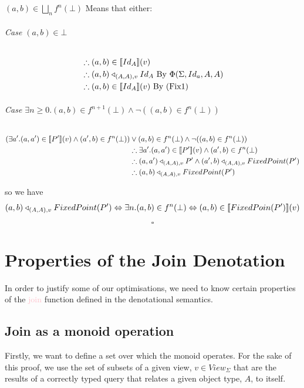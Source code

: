 \documentclass[12pt,a4paper,twoside,openright]{report}
\newcommand\mathName[1]{\textcolor{pink}{#1}}
\newcommand{\db}[1]{{\bf [\![}#1{\bf ]\!]}}
\newcommand{\deno}[1]{\db{#1}(v)}
\newcommand{\denoRule}[2]{#1 \in \deno{#2}}
\newcommand{\opRule}[3]{#1 \triangleleft_{#2, v} #3}
\newcommand{\phiRule}[3]{\Phi(\Sigma, #1, #2, #3)}
\begin{document}
$(a, b) \in \bigsqcup_n f^n(\bot)$ Means that either:

\subparagraph{Case $(a, b) \in \bot$}
\begin{equation}
\label{Case Bottom}
\begin{split}
& \therefore \denoRule{(a,b)}{Id_A}\\
& \therefore \opRule{(a,b)}{(A, A)}{Id_A} \mbox{ By $\phiRule{Id_a}{A}{A}$}\\
& \therefore \denoRule{(a,b)}{Id_A} \mbox{ By (Fix1)}
\end{split}
\end{equation}

\subparagraph{Case $\exists n \geq 0. (a, b) \in f^{n+1}(\bot) \wedge \neg ((a, b) \in f^n(\bot))$}
\begin{equation}
\label{Case n+1}
\begin{split}
(\exists a'. \denoRule{(a, a')}{P'} \wedge (a', b) \in f^{n}(\bot)) & \vee (a, b) \in f^{n}(\bot) \wedge \neg ((a, b) \in f^n(\bot))\\
&\therefore \exists a'. \denoRule{(a, a')}{P'} \wedge (a', b) \in f^{n}(\bot)\\
&\therefore \opRule{(a, a')}{(A, A)}{P'} \wedge \opRule{(a', b)}{(A, A)}{FixedPoint(P')}\\
&\therefore \opRule{(a,b)}{(A,A)}{FixedPoint(P')}
\end{split}
\end{equation}

so we have \[\opRule{(a, b)}{(A, A)}{FixedPoint(P')} \Leftrightarrow \exists n. (a, b) \in f^n(\bot) \Leftrightarrow \denoRule{(a, b)}{FixedPoin(P')}\]

$$\square$$

\chapter{Properties of the Join Denotation}
\label{MonoidJoins}

In order to justify some of our optimisations, we need to know certain properties of the \mathName{join} function defined in the denotational semantics. 

\section{Join as a monoid operation}
Firstly, we want to define a set over which the monoid operates. For the sake of this proof, we use the set of subsets of a given view, $v \in View_{\Sigma}$ that are the results of a correctly typed query that relates a given object type, $A$, to itself.
\end{document}
